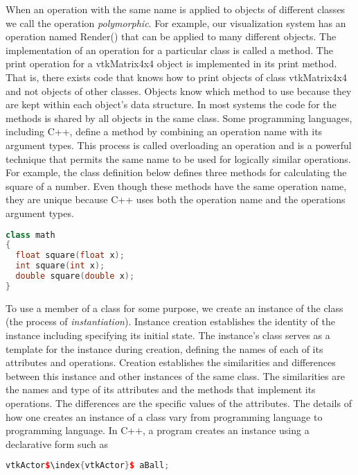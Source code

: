 When an operation with the same name is applied to objects of different classes we call the operation \emph{polymorphic}. For example, our visualization system has an operation named Render() that can be applied to many different objects. The implementation of an operation for a particular class is called a method. The print operation for a vtkMatrix4x4 object is implemented in its print method. That is, there exists code that knows how to print objects of class vtkMatrix4x4 and not objects of other classes. Objects know which method to use because they are kept within each object's data structure. In most systems the code for the methods is shared by all objects in the same class. Some programming languages, including C++, define a method by combining an operation name with its argument types. This process is called overloading an operation and is a powerful technique that permits the same name to be used for logically similar operations. For example, the class definition below defines three methods for calculating the square of a number. Even though these methods have the same operation name, they are unique because C++ uses both the operation name and the operations argument types.

\begin{lstlisting}[language=C++, caption={math class.}]
class math
{
  float square(float x);
  int square(int x);
  double square(double x);
}
\end{lstlisting}

To use a member of a class for some purpose, we create an instance of the class (the process of \emph{instantiation}). Instance creation establishes the identity of the instance including specifying its initial state. The instance's class serves as a template for the instance during creation, defining the names of each of its attributes and operations. Creation establishes the similarities and differences between this instance and other instances of the same class. The similarities are the names and type of its attributes and the methods that implement its operations. The differences are the specific values of the attributes. The details of how one creates an instance of a class vary from programming language to programming language. In C++, a program creates an instance using a declarative form such as

\begin{lstlisting}[language=C++,  caption={}, numbers=none, frame=none, escapechar=\$]
vtkActor$\index{vtkActor}$ aBall;
\end{lstlisting}

